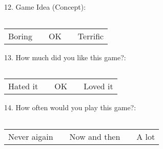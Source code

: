 12. Game Idea (Concept):
\begin{center}
 	\begin{tabular}{| p{1cm} | p{1cm} | p{1cm} | p{1cm} | p{1cm} |}
    	\hline
     	&  &  &  &  \\ \hline
  	\end{tabular}
\end{center}
\begin{center}
	\begin{tabular}{ >{\centering\arraybackslash}p{1cm}  >{\centering\arraybackslash}p{1cm}  >{\centering\arraybackslash}p{1cm}  >{\centering\arraybackslash}p{1cm}  >{\centering\arraybackslash}p{1cm} }
    Boring &  & OK &  & Terrific \\ 
 	\end{tabular}
\end{center}

13. How much did you like this game?:
\begin{center}
 	\begin{tabular}{| p{1cm} | p{1cm} | p{1cm} | p{1cm} | p{1cm} |}
    	\hline
     	&  &  &  &  \\ \hline
  	\end{tabular}
\end{center}
\begin{center}
	\begin{tabular}{ >{\centering\arraybackslash}p{1cm}  >{\centering\arraybackslash}p{1cm}  >{\centering\arraybackslash}p{1cm}  >{\centering\arraybackslash}p{1cm}  >{\centering\arraybackslash}p{1cm} }
    Hated it &  & OK &  & Loved it \\ 
 	\end{tabular}
\end{center}

14. How often would you play this game?:
\begin{center}
 	\begin{tabular}{| p{1cm} | p{1cm} | p{1cm} | p{1cm} | p{1cm} |}
    	\hline
     	&  &  &  &  \\ \hline
  	\end{tabular}
\end{center}
\begin{center}
	\begin{tabular}{ >{\centering\arraybackslash}p{1cm}  >{\centering\arraybackslash}p{1cm}  >{\centering\arraybackslash}p{1cm}  >{\centering\arraybackslash}p{1cm}  >{\centering\arraybackslash}p{1cm} }
    Never aigain &  & Now and then &  & A lot \\ 
 	\end{tabular}
\end{center}

